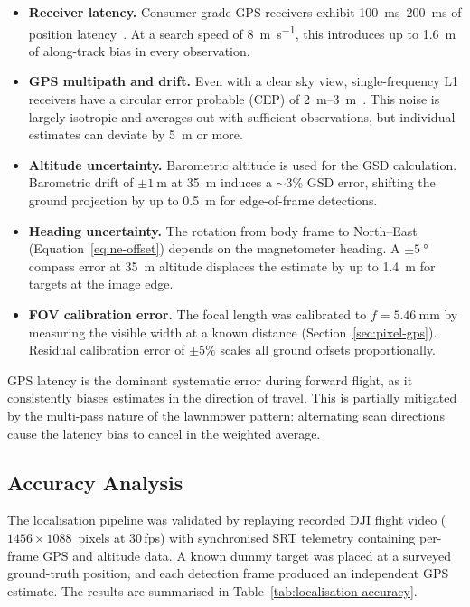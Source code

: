 \begin{itemize}
  \item \textbf{Receiver latency.} Consumer-grade GPS receivers exhibit \SIrange{100}{200}{\milli\second} of position latency~\cite{misra2006global}. At a search speed of \SI{8}{\metre\per\second}, this introduces up to \SI{1.6}{\metre} of along-track bias in every observation.
  \item \textbf{GPS multipath and drift.} Even with a clear sky view, single-frequency L1 receivers have a circular error probable (CEP) of \SIrange{2}{3}{\metre}~\cite{kaplan2017understanding}. This noise is largely isotropic and averages out with sufficient observations, but individual estimates can deviate by \SI{5}{\metre} or more.
  \item \textbf{Altitude uncertainty.} Barometric altitude is used for the GSD calculation. Barometric drift of $\pm\SI{1}{\metre}$ at \SI{35}{\metre} induces a ${\sim}3\%$ GSD error, shifting the ground projection by up to \SI{0.5}{\metre} for edge-of-frame detections.
  \item \textbf{Heading uncertainty.} The rotation from body frame to North--East (Equation~\ref{eq:ne-offset}) depends on the magnetometer heading. A $\pm\SI{5}{\degree}$ compass error at \SI{35}{\metre} altitude displaces the estimate by up to \SI{1.4}{\metre} for targets at the image edge.
  \item \textbf{FOV calibration error.} The focal length was calibrated to $f = \SI{5.46}{\milli\metre}$ by measuring the visible width at a known distance (Section~\ref{sec:pixel-gps}). Residual calibration error of $\pm5\%$ scales all ground offsets proportionally.
\end{itemize}

\noindent GPS latency is the dominant systematic error during forward flight, as it consistently biases estimates in the direction of travel. This is partially mitigated by the multi-pass nature of the lawnmower pattern: alternating scan directions cause the latency bias to cancel in the weighted average.

\subsection{Accuracy Analysis}\label{sec:accuracy}

The localisation pipeline was validated by replaying recorded DJI flight video ($1456 \times 1088$~pixels at 30\,fps) with synchronised SRT telemetry containing per-frame GPS and altitude data. A known dummy target was placed at a surveyed ground-truth position, and each detection frame produced an independent GPS estimate. The results are summarised in Table~\ref{tab:localisation-accuracy}.

